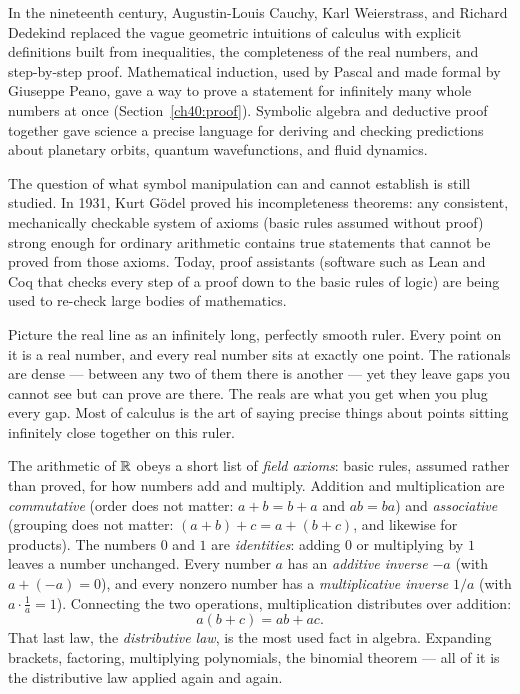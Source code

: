 \begin{historybox}
In the nineteenth century, Augustin-Louis Cauchy, Karl
Weierstrass, and Richard Dedekind replaced the vague geometric intuitions of calculus
with explicit definitions built from inequalities, the completeness of the real
numbers, and step-by-step proof. Mathematical induction, used by Pascal
and made formal by Giuseppe Peano, gave a way to prove a statement for infinitely
many whole numbers at once (Section~\ref{ch40:proof}). Symbolic algebra and
deductive proof together gave science a precise language for deriving and
checking predictions about planetary orbits, quantum wavefunctions, and fluid
dynamics.

The question of what symbol manipulation can and cannot establish is still
studied. In 1931, Kurt G\"odel proved his incompleteness theorems: any
consistent, mechanically checkable system of axioms (basic rules assumed without
proof) strong enough for ordinary arithmetic contains true statements that cannot
be proved from those axioms. Today, proof assistants (software such as Lean and
Coq that checks every step of a proof down to the basic rules of logic) are being
used to re-check large bodies of mathematics.
\end{historybox}

\begin{intuitionbox}
Picture the real line as an infinitely long, perfectly smooth ruler. Every point
on it is a real number, and every real number sits at exactly one point. The
rationals are dense --- between any two of them there is another --- yet they leave
gaps you cannot see but can prove are there. The reals are what you get when you
plug every gap. Most of calculus is the art of saying precise things about points
sitting infinitely close together on this ruler.
\end{intuitionbox}

The arithmetic of $\mathbb{R}$ obeys a short list of \emph{field axioms}: basic rules,
assumed rather than proved, for how numbers add and multiply.
Addition and multiplication are \emph{commutative} (order does not matter:
$a+b=b+a$ and $ab=ba$) and \emph{associative} (grouping does not matter:
$(a+b)+c=a+(b+c)$, and likewise for products). The numbers $0$ and $1$ are
\emph{identities}: adding $0$ or multiplying by $1$ leaves a number unchanged.
Every number $a$ has an \emph{additive inverse} $-a$ (with $a+(-a)=0$), and every
nonzero number has a \emph{multiplicative inverse} $1/a$ (with $a\cdot\tfrac1a=1$).
Connecting the two operations, multiplication distributes over addition:
\[
  a(b+c) = ab + ac.
\]
That last law, the \emph{distributive law}, is the most used fact in algebra. Expanding brackets, factoring, multiplying polynomials, the
binomial theorem --- all of it is the distributive law applied again and again.

